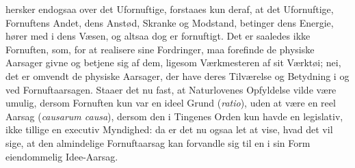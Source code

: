 \documentclass[12pt,a4paper]{book}
\begin{document}
\setcounter{footnote}{0}
hersker endogsaa over det Ufornuftige, forstaaes kun deraf, at det Ufornuftige,
Fornuftens Andet, dens Anstød, Skranke og Modstand, betinger dens Energie,
hører med i dens Væsen, og altsaa dog er fornuftigt. Det er saaledes ikke
Fornuften, som, for at realisere sine Fordringer, maa forefinde de physiske
Aarsager givne og betjene sig af dem, ligesom Værkmesteren af sit Værktøi; nei,
det er omvendt de physiske Aarsager, der have deres Tilværelse og Betydning i
og ved Fornuftaarsagen. Staaer det nu fast, at Naturlovenes Opfyldelse vilde
være umulig, dersom Fornuften kun var en ideel Grund (\textit{ratio}), uden at
være en reel Aarsag (\textit{causarum causa}), dersom den i Tingenes Orden kun
havde en legislativ, ikke tillige en executiv Myndighed: da er det nu ogsaa let
at vise, hvad det vil sige, at den almindelige Fornuftaarsag kan forvandle sig
til en i sin Form eiendommelig Idee-Aarsag.
\end{document}
